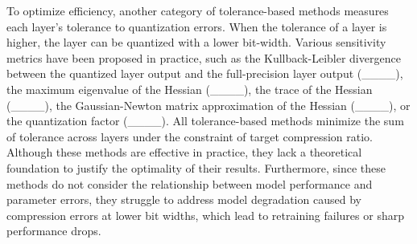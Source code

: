 To optimize efficiency, another category of tolerance-based methods measures each layer's tolerance to quantization errors. When the tolerance of a layer is higher, the layer can be quantized with a lower bit-width. Various sensitivity metrics have been proposed in practice, such as the Kullback-Leibler divergence between the quantized layer output and the full-precision layer output (____), the maximum eigenvalue of the Hessian (____), the trace of the Hessian (____), the Gaussian-Newton matrix approximation of the Hessian (____), or the quantization factor (____). All tolerance-based methods minimize the sum of tolerance across layers under the constraint of target compression ratio.
Although these methods are effective in practice, they lack a theoretical foundation to justify the optimality of their results. Furthermore, since these methods do not consider the relationship between model performance and parameter errors, they struggle to address model degradation caused by compression errors at lower bit widths, which lead to retraining failures or sharp performance drops.
\vspace{-0.4cm}